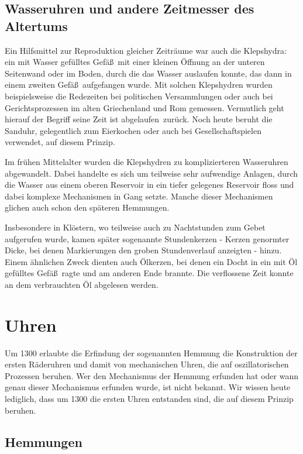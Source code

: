 \subsection{Wasseruhren und andere Zeitmesser des Altertums}

Ein Hilfsmittel zur Reproduktion gleicher Zeitr\"aume war auch die Klepshydra: 
ein mit Wasser
gef\"ulltes Gef\"a\ss\ mit einer kleinen \"Offnung an der unteren Seitenwand oder im Boden, 
durch die das Wasser auslaufen
konnte, das dann in einem zweiten Gef\"a\ss\ aufgefangen wurde. Mit solchen Klepshydren wurden
beispielsweise die Redezeiten bei politischen Versammlungen oder auch bei Gerichtsprozessen im alten 
Griechenland und Rom
gemessen. Vermutlich geht hierauf der Begriff \glqq seine Zeit ist abgelaufen\grqq\ zur\"uck. Noch heute
beruht die Sanduhr, gelegentlich zum Eierkochen oder auch bei Gesellschaftspielen verwendet, 
auf diesem Prinzip.

Im fr\"uhen Mittelalter wurden die Klepshydren zu komplizierteren Wasseruhren abgewandelt. 
Dabei handelte es sich um teilweise sehr aufwendige Anlagen, durch die Wasser aus einem
oberen Reservoir in ein tiefer gelegenes Reservoir floss und dabei komplexe Mechanismen
in Gang setzte. Manche dieser Mechanismen glichen auch schon den sp\"ateren Hemmungen.

Insbesondere in Kl\"ostern, wo teilweise auch zu Nachtstunden zum Gebet aufgerufen wurde, kamen sp\"ater
sogenannte 
Stundenkerzen - Kerzen genormter Dicke, bei denen Markierungen den groben
Stundenverlauf anzeigten - hinzu. Einem \"ahnlichen Zweck dienten auch \"Olkerzen, bei denen
ein Docht in ein mit \"Ol gef\"ulltes Gef\"a\ss\ ragte und am anderen Ende brannte. Die
verflossene Zeit konnte an dem verbrauchten \"Ol abgelesen werden.

\section{Uhren}

Um 1300 erlaubte die Erfindung der sogenannten Hemmung die Konstruktion der
ersten R\"aderuhren und damit von mechanischen Uhren, die auf oszillatorischen Prozessen beruhen. 
Wer den Mechanismus der Hemmung erfunden hat oder wann genau dieser
Mechanismus erfunden wurde, ist nicht bekannt. Wir wissen heute lediglich, dass um 1300 die
ersten Uhren entstanden sind, die auf diesem Prinzip beruhen. 

\subsection{Hemmungen}

